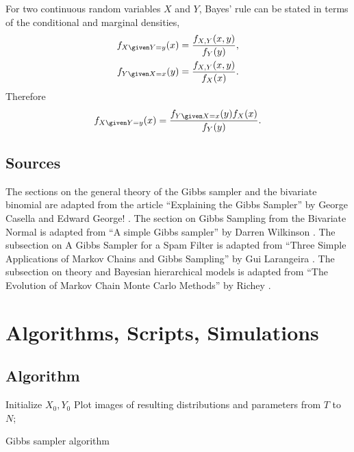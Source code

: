 \documentclass[12pt]{article}
\begin{document}
For two continuous random variables \( X \) and \( Y \), Bayes' rule can
be stated in terms of the conditional and marginal densities,
\begin{align*}
    f_{X \given Y = y}(x) &= \frac{f_{X,Y}(x,y)}{f_Y(y)}, \\
    f_{Y \given X = x}(y) &= \frac{f_{X,Y}(x,y)}{f_X(x)}.
\end{align*}
Therefore
\[
    f_{X \given Y=y}(x) = \frac{f_{Y \given X = x}(y) f_X(x)}{f_Y(y)}.
\]

\subsection*{Sources} The sections on the general theory of the Gibbs
sampler and the bivariate binomial are adapted from the article
``Explaining the Gibbs Sampler'' by George Casella and Edward George!
\cite{casella92}.  The section on Gibbs Sampling from the Bivariate
Normal is adapted from ``A simple Gibbs sampler'' by Darren Wilkinson
\cite{wilkinson}.  The subsection on A Gibbs Sampler for a Spam Filter
is adapted from ``Three Simple Applications of Markov Chains and Gibbs
Sampling'' by Gui Larangeira
\cite{larangeira}.  The subsection on theory and Bayesian hierarchical
models is adapted from ``The Evolution of Markov Chain Monte Carlo
Methods'' by Richey
\cite{richey10}.

\hr

\section*{Algorithms, Scripts, Simulations}

\subsection*{Algorithm}

\begin{algorithm}
  \DontPrintSemicolon
  Initialize \( X_0, Y_0 \)\;
  Plot images of resulting distributions and parameters from \( T \)
  to \( N \);
  \caption{Gibbs sampler algorithm}
\end{algorithm}
\end{document}
